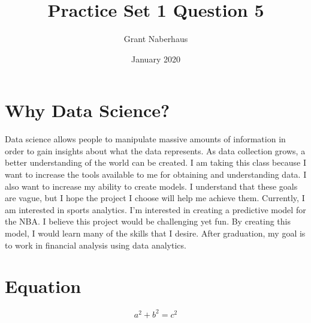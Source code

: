 \documentclass[12pt, letterpaper]{article}
\title{Practice Set 1 Question 5}
\author{Grant Naberhaus }
\date{January 2020}
\begin{document}
\maketitle

\section{Why Data Science?}

Data science allows people to manipulate massive amounts of information in order to gain insights about what the data represents. As data collection grows, a better understanding of the world can be created. I am taking this class because I want to increase the tools available to me for obtaining and understanding data. I also want to increase my ability to create models. I understand that these goals are vague, but I hope the project I choose will help me achieve them. Currently, I am interested in sports analytics. I'm interested in creating a predictive model for the NBA. I believe this project would be challenging yet fun. By creating this model, I would learn many of the skills that I desire. After graduation, my goal is to work in financial analysis using data analytics. 

\section{Equation}


\[ a^2 + b^2 = c^2 \]
\end{document}
